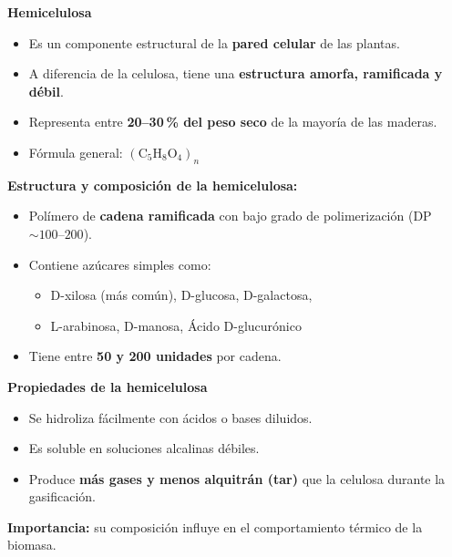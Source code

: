 \documentclass[../../main.tex]{subfiles}
\begin{document}
\begin{frame}{\textbf{Hemicelulosa}}
\begin{itemize}
  \item Es un componente estructural de la \textbf{pared celular} de las plantas.
  \item A diferencia de la celulosa, tiene una \textbf{estructura amorfa, ramificada y débil}.
  \item Representa entre \textbf{20–30 \% del peso seco} de la mayoría de las maderas.
  \item Fórmula general: \( (\text{C}_5\text{H}_8\text{O}_4)_n \)
\end{itemize}

\vspace{1em}
\textbf{Estructura y composición de la hemicelulosa:}
\begin{itemize}
  \item Polímero de \textbf{cadena ramificada} con bajo grado de polimerización (DP \( \sim 100\text{--}200 \)).
  \item Contiene azúcares simples como:
  \begin{itemize}
    \item D-xilosa (más común), D-glucosa, D-galactosa,
    \item L-arabinosa, D-manosa, Ácido D-glucurónico
  \end{itemize}
  \item Tiene entre \textbf{50 y 200 unidades} por cadena.
\end{itemize}
\end{frame}


\begin{frame}{\textbf{Propiedades de la hemicelulosa}}
\begin{itemize}
  \item Se hidroliza fácilmente con ácidos o bases diluidos.
  \item Es soluble en soluciones alcalinas débiles.
  \item Produce \textbf{más gases y menos alquitrán (tar)} que la celulosa durante la gasificación.
\end{itemize}

\vspace{1em}
\textbf{Importancia:} su composición influye en el comportamiento térmico de la biomasa.
\end{frame}
\end{document}
